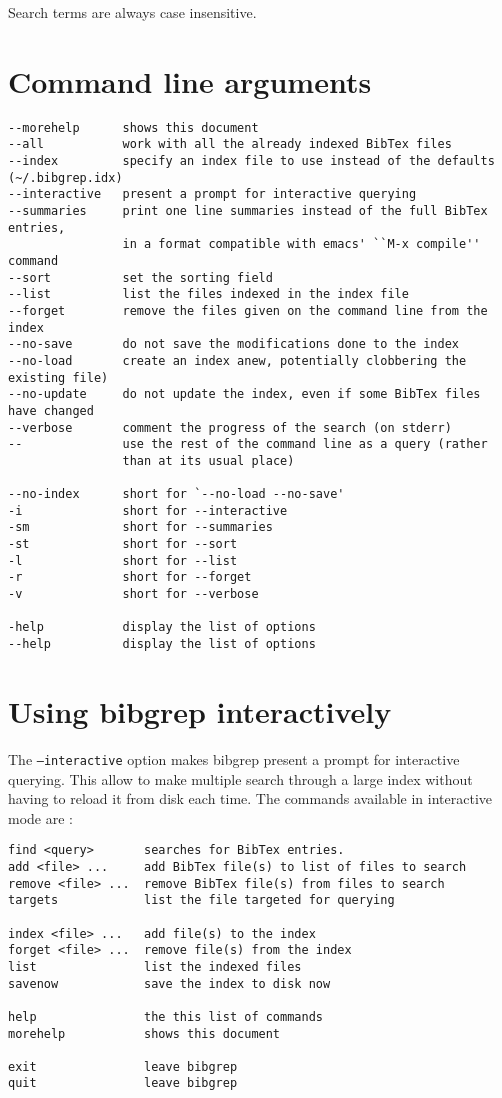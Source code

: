 \documentclass[11pt]{article}
\begin{document}
   Search terms are always case insensitive.


\section*{Command line arguments}
\linespread{1}
\small
\begin{verbatim}
--morehelp      shows this document
--all           work with all the already indexed BibTex files 
--index         specify an index file to use instead of the defaults (~/.bibgrep.idx) 
--interactive   present a prompt for interactive querying 
--summaries     print one line summaries instead of the full BibTex entries, 
                in a format compatible with emacs' ``M-x compile'' command 
--sort          set the sorting field 
--list          list the files indexed in the index file 
--forget        remove the files given on the command line from the index 
--no-save       do not save the modifications done to the index 
--no-load       create an index anew, potentially clobbering the existing file) 
--no-update     do not update the index, even if some BibTex files have changed 
--verbose       comment the progress of the search (on stderr)
--              use the rest of the command line as a query (rather
                than at its usual place) 
 
--no-index      short for `--no-load --no-save' 
-i              short for --interactive 
-sm             short for --summaries 
-st             short for --sort 
-l              short for --list 
-r              short for --forget 
-v              short for --verbose 
 
-help           display the list of options 
--help          display the list of options

\end{verbatim}
\normalsize
\linespread{1.2}

\section*{Using bibgrep interactively}

The {\tt --interactive} option makes bibgrep present a prompt for
interactive querying. This allow to make multiple search through 
a large index without having to reload it from disk each time. The
commands available in interactive mode are :

\small
\linespread{1}
\begin{verbatim}
find <query>       searches for BibTex entries.
add <file> ...     add BibTex file(s) to list of files to search
remove <file> ...  remove BibTex file(s) from files to search
targets            list the file targeted for querying

index <file> ...   add file(s) to the index
forget <file> ...  remove file(s) from the index
list               list the indexed files
savenow            save the index to disk now

help               the this list of commands
morehelp           shows this document

exit               leave bibgrep
quit               leave bibgrep
\end{verbatim}
\linespread{1.2}
\end{document}

